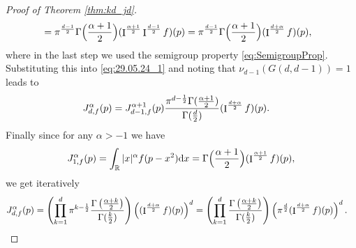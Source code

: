 \documentclass[11pt,a4paper]{article}
\theoremstyle{plain}
\theoremstyle{definition}
\theoremstyle{remark}
\def\RR{\mathbb{R}}
\newcommand{\dd}{{\rm d}}
\newcommand{\frI}{\mathop{\mathrm{I}}\nolimits}
\begin{document}
\begin{proof}[Proof of Theorem \ref{thm:kd_jd}]
\begin{align*}
        &=\pi^{d-1\over 2}\Gamma\Big({\alpha+1\over 2}\Big)(\frI^{\alpha+1\over 2}\frI^{d-1\over 2}f)(p)=\pi^{d-1\over 2}\Gamma\Big({\alpha+1\over 2}\Big)(\frI^{d+\alpha\over 2} f)(p),
    \end{align*}
    where in the last step we used the semigroup property \eqref{eq:SemigroupProp}. Substituting this into \eqref{eq:29.05.24_1} and noting that $\nu_{d-1}(G(d,d-1))=1$ leads to
    \begin{align*}
    J_{d,f}^{\alpha}(p)&= J_{d-1,f}^{\alpha+1}(p){\pi^{d-{1\over 2}}\Gamma({\alpha+1\over 2})\over \Gamma(\frac{d}{2})}(\frI^{d+\alpha\over 2} f)(p).
    \end{align*}
        Finally since for any $\alpha>-1$ we have
    \begin{align*}
        J_{1,f}^{\alpha}(p)=\int_{\RR}|x|^{\alpha}f(p-x^2)\dd x = \Gamma\Big(\frac{\alpha+1}{2}\Big)(\frI^{\frac{\alpha+1}{2}}f)(p),
    \end{align*}
    we get iteratively 
        \begin{align*}
        &J_{d,f}^{\alpha}(p) = \left(\prod_{k=1}^{d}\pi^{k-{1\over 2}}\frac{\Gamma\left(\frac{\alpha+k}{2}\right)}{\Gamma(\frac{k}{2})}\right) \left((\frI^{\frac{d+\alpha}{2}}f)(p)\right)^d=\left(\prod_{k=1}^{d}\frac{\Gamma\left(\frac{\alpha+k}{2}\right)}{\Gamma(\frac{k}{2})}\right) \left(\pi^{\frac{d}{2}}(\frI^{\frac{d+\alpha}{2}}f)(p)\right)^d.
    \end{align*}



\end{proof}
\end{document}
